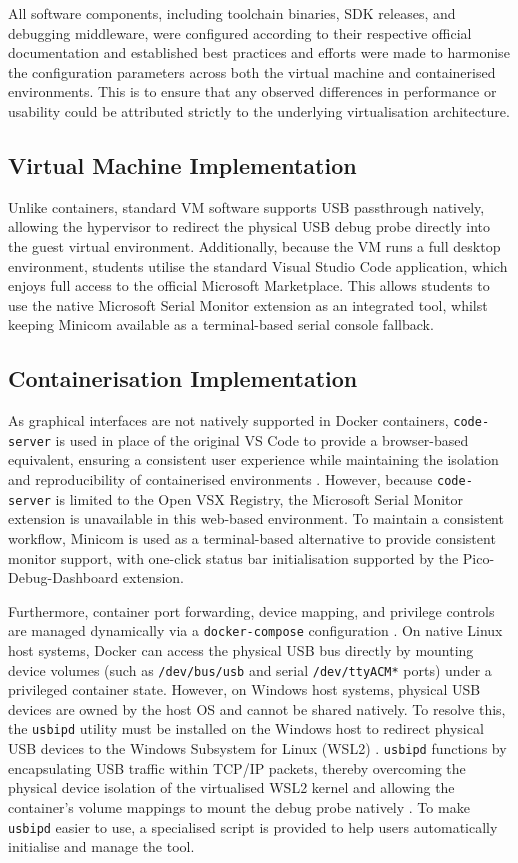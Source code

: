 All software components, including toolchain binaries, SDK releases, and debugging middleware, were configured according to their respective official documentation and established best practices and efforts were made to harmonise the configuration parameters across both the virtual machine and containerised environments. This is to ensure that any observed differences in performance or usability could be attributed strictly to the underlying virtualisation architecture.
\subsection{Virtual Machine Implementation}
Unlike containers, standard VM software supports USB passthrough natively, allowing the hypervisor to redirect the physical USB debug probe directly into the guest virtual environment. Additionally, because the VM runs a full desktop environment, students utilise the standard Visual Studio Code application, which enjoys full access to the official Microsoft Marketplace. This allows students to use the native Microsoft Serial Monitor extension as an integrated tool, whilst keeping Minicom available as a terminal-based serial console fallback.

\subsection{Containerisation Implementation}
As graphical interfaces are not natively supported in Docker containers, \texttt{code-server} is used in place of the original VS Code to provide a browser-based equivalent, ensuring a consistent user experience while maintaining the isolation and reproducibility of containerised environments \cite{code_server}. However, because \texttt{code-server} is limited to the Open VSX Registry, the Microsoft Serial Monitor extension is unavailable in this web-based environment. To maintain a consistent workflow, Minicom is used as a terminal-based alternative to provide consistent monitor support, with one-click status bar initialisation supported by the Pico-Debug-Dashboard extension.

Furthermore, container port forwarding, device mapping, and privilege controls are managed dynamically via a \texttt{docker-compose} configuration \cite{docker_compose_docs}. On native Linux host systems, Docker can access the physical USB bus directly by mounting device volumes (such as \texttt{/dev/bus/usb} and serial \texttt{/dev/ttyACM*} ports) under a privileged container state. However, on Windows host systems, physical USB devices are owned by the host OS and cannot be shared natively. To resolve this, the \texttt{usbipd} utility must be installed on the Windows host to redirect physical USB devices to the Windows Subsystem for Linux (WSL2) \cite{docker_wsl_docs, dorssel_usbipd_win}. \texttt{usbipd} functions by encapsulating USB traffic within TCP/IP packets, thereby overcoming the physical device isolation of the virtualised WSL2 kernel and allowing the container's volume mappings to mount the debug probe natively \cite{docker_wsl_docs}. To make \texttt{usbipd} easier to use, a specialised script is provided to help users automatically initialise and manage the tool.
